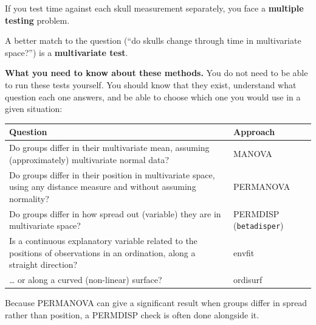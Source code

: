\documentclass[
  letterpaper,
  8pt,
  a4paper]{book}
\newcounter{none} %
\begin{document}

If you test time against each skull measurement separately, you face a
\textbf{multiple testing} problem.

A better match to the question (``do skulls change through time in
multivariate space?'') is a \textbf{multivariate test}.

\begin{tcolorbox}[enhanced jigsaw, arc=.35mm, bottomrule=.15mm, bottomtitle=1mm, breakable, colback=white, colbacktitle=quarto-callout-important-color!10!white, colframe=quarto-callout-important-color-frame, coltitle=black, left=2mm, leftrule=.75mm, opacityback=0, opacitybacktitle=0.6, rightrule=.15mm, title=\textcolor{quarto-callout-important-color}{\faExclamation}\hspace{0.5em}{Important}, titlerule=0mm, toprule=.15mm, toptitle=1mm]

\textbf{What you need to know about these methods.} You do not need to
be able to run these tests yourself. You should know that they exist,
understand what question each one answers, and be able to choose which
one you would use in a given situation:

{\def\LTcaptype{none} %
\begin{longtable}[]{@{}
  >{\raggedright\arraybackslash}p{}
  >{\raggedright\arraybackslash}p{}@{}}
\toprule\noalign{}
\begin{minipage}[b]{\linewidth}\raggedright
Question
\end{minipage} & \begin{minipage}[b]{\linewidth}\raggedright
Approach
\end{minipage} \\
\midrule\noalign{}
\endhead
\bottomrule\noalign{}
\endlastfoot
Do groups differ in their multivariate mean, assuming (approximately)
multivariate normal data? & MANOVA \\
Do groups differ in their position in multivariate space, using any
distance measure and without assuming normality? & PERMANOVA \\
Do groups differ in how spread out (variable) they are in multivariate
space? & PERMDISP (\texttt{betadisper}) \\
Is a continuous explanatory variable related to the positions of
observations in an ordination, along a straight direction? & envfit \\
\ldots{} or along a curved (non-linear) surface? & ordisurf \\
\end{longtable}
}

Because PERMANOVA can give a significant result when groups differ in
spread rather than position, a PERMDISP check is often done alongside
it.

\end{tcolorbox}
\end{document}
